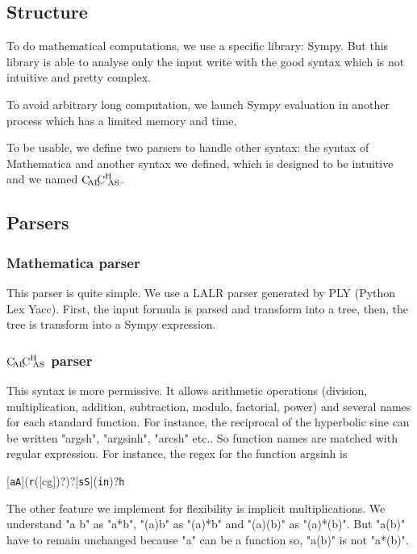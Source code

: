\subsection{Structure}

To do mathematical computations, we use a specific library: Sympy. But this library is able to analyse only the input write with the good syntax which is not intuitive and pretty complex.

To avoid arbitrary long computation, we launch Sympy evaluation in another process which has a limited memory and time.

To be usable, we define two parsers to handle other syntax: the syntax of Mathematica and another syntax we defined, which is designed to be intuitive and we named $\text{C}\hspace{-2pt}_{\text{AL}}\hspace{-3pt}\text{C}^{\text{H}}{\hspace{-4pt}}_\text{AS}$.

\subsection{Parsers}

\subsubsection{Mathematica parser}

This parser is quite simple. We use a LALR parser generated by PLY (Python Lex Yacc). First, the input formula is parsed and transform into a tree, then, the tree is transform into a Sympy expression.

\subsubsection{\texorpdfstring{$\text{C}\hspace{-2pt}_{\text{AL}}\hspace{-3pt}\text{C}^{\text{H}}{\hspace{-4pt}}_\text{AS}$}{CalChAS} parser}

This syntax is more permissive. It allows arithmetic operations (division, multiplication, addition, subtraction, modulo, factorial, power) and several names for each standard function. For instance, the 
reciprocal of the hyperbolic sine can be written "argsh", "argsinh", "arcsh" etc.. So function names are matched with regular expression. For instance, the regex for the function argsinh is \begin{center}[\texttt{aA}](\texttt{r}([cg])?)?[\texttt{sS}](\texttt{in})?\texttt{h}\end{center}

The other feature we implement for flexibility is implicit multiplications. We understand "a b" as "a*b", "(a)b" as "(a)*b" and "(a)(b)" as "(a)*(b)". But "a(b)" have to remain unchanged because "a" can be a function so, "a(b)" is not "a*(b)".

